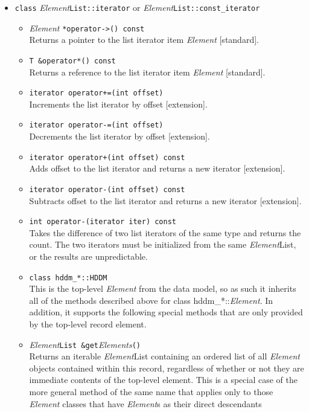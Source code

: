\documentclass{revtex4}
\begin{document}
\begin{itemize}
\item \texttt{class} {\em Element}\texttt{List::iterator} or {\em Element}\texttt{List::const\_iterator}\\
\begin{itemize}
\item {\em Element} \texttt{*operator->() const}\\
Returns a pointer to the list iterator item {\em Element} [standard].
\item \texttt{T \&operator*() const}\\
Returns a reference to the list iterator item {\em Element} [standard].
\item \texttt{iterator operator+=(int offset)}\\
Increments the list iterator by offset [extension].
\item \texttt{iterator operator-=(int offset)}\\
Decrements the list iterator by offset [extension].
\item \texttt{iterator operator+(int offset) const}\\
Adds offset to the list iterator and returns a new iterator [extension].
\item \texttt{iterator operator-(int offset) const}\\
Subtracts offset to the list iterator and returns a new iterator [extension].
\item \texttt{int operator-(iterator iter) const}\\
Takes the difference of two list iterators of the same type and returns the
count. The two iterators must be initialized from the same {\em Element}List,
or the results are unpredictable.
\item \texttt{class hddm\_*::HDDM}\\
This is the top-level {\em Element} from the data model, so as such it inherits all
of the methods described above for class hddm\_*::{\em Element}. In addition, it
supports the following special methods that are only provided by the top-level
record element.
\item {\em Element}\texttt{List \&get}{\em Elements}\texttt{()}\\
Returns an iterable {\em Element}List containing an ordered list of all 
{\em Element} objects contained within this record, regardless of whether
or not they are immediate contents of the top-level element. This is a special
case of the more general method of the same name that applies only to those
{\em Element} classes that have {\em Element}s as their direct descendants

\end{itemize}
\end{itemize}
\end{document}
